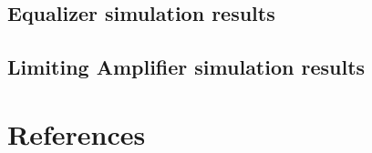 \documentclass[15pt,a4paper]{article}
\begin{document}
\begin{spacing}{1.25}
\subsection{Equalizer simulation results}

\subsection{Limiting Amplifier simulation results}

\section{References}                        %

\end{spacing}



\end{document}
